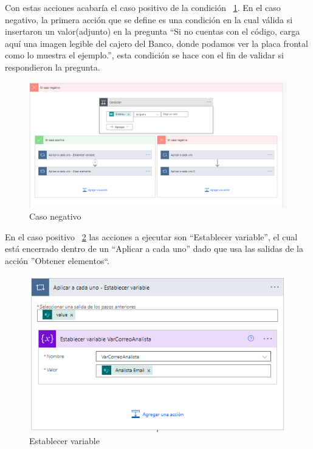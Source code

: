 Con estas acciones acabaría el caso positivo de la condición ~\ref{fig:Cnegativo}. En el caso negativo, la primera acción que se define es una condición en la cual válida si insertaron un valor(adjunto) en la pregunta ``Si no cuentas con el código, carga aquí una imagen legible del cajero del Banco, donde podamos ver la placa frontal como lo muestra el ejemplo.'',  esta condición se hace con el fin de validar si respondieron la pregunta.

\begin{figure}[H]
	\centering
	\includegraphics[scale=0.5]{Capitulo3/imagenes/flujo7.png}
	\caption{Caso negativo}
	\label{fig:Cnegativo}
\end{figure}

En el caso positivo ~\ref{fig:Evar2} las acciones a ejecutar son ``Establecer variable'', el cual está encerrado dentro de un ``Aplicar a cada uno'' dado que usa las salidas de la acción ''Obtener elementos``.

\begin{figure}[H]
	\centering
	\includegraphics[scale=0.5]{Capitulo3/imagenes/flujo9.png}
	\caption{Establecer variable}
	\label{fig:Evar2}
\end{figure}

